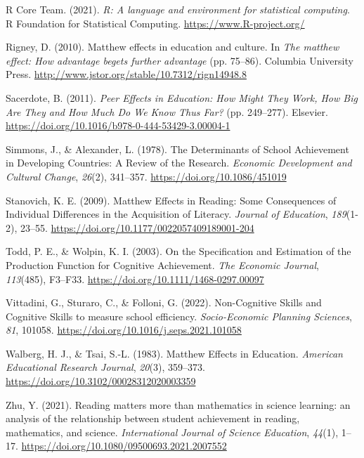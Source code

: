 \documentclass[
]{article}
\newlength{\cslhangindent}
\newenvironment{CSLReferences}[2] %
 {\begin{list}{}{%
  \setlength{\itemindent}{0pt}
  \setlength{\leftmargin}{0pt}
  \setlength{\parsep}{0pt}
  \ifodd #1
   \setlength{\leftmargin}{\cslhangindent}
   \setlength{\itemindent}{-1\cslhangindent}
  \fi
  \setlength{\itemsep}{#2\baselineskip}}}
 {\end{list}}
\begin{document}
\begin{CSLReferences}{1}{0}
R Core Team. (2021). \emph{R: A language and environment for statistical
computing}. R Foundation for Statistical Computing.
\url{https://www.R-project.org/}

Rigney, D. (2010). Matthew effects in education and culture. In
\emph{The matthew effect: How advantage begets further advantage} (pp.
75--86). Columbia University Press.
\url{http://www.jstor.org/stable/10.7312/rign14948.8}

Sacerdote, B. (2011). \emph{Peer Effects in Education: How Might They
Work, How Big Are They and How Much Do We Know Thus Far?} (pp.
249--277). Elsevier.
\url{https://doi.org/10.1016/b978-0-444-53429-3.00004-1}

Simmons, J., \& Alexander, L. (1978). The Determinants of School
Achievement in Developing Countries: A Review of the Research.
\emph{Economic Development and Cultural Change}, \emph{26}(2), 341--357.
\url{https://doi.org/10.1086/451019}

Stanovich, K. E. (2009). Matthew Effects in Reading: Some Consequences
of Individual Differences in the Acquisition of Literacy. \emph{Journal
of Education}, \emph{189}(1-2), 23--55.
\url{https://doi.org/10.1177/0022057409189001-204}

Todd, P. E., \& Wolpin, K. I. (2003). On the Specification and
Estimation of the Production Function for Cognitive Achievement.
\emph{The Economic Journal}, \emph{113}(485), F3--F33.
\url{https://doi.org/10.1111/1468-0297.00097}

Vittadini, G., Sturaro, C., \& Folloni, G. (2022). Non-Cognitive Skills
and Cognitive Skills to measure school efficiency. \emph{Socio-Economic
Planning Sciences}, \emph{81}, 101058.
\url{https://doi.org/10.1016/j.seps.2021.101058}

Walberg, H. J., \& Tsai, S.-L. (1983). Matthew Effects in Education.
\emph{American Educational Research Journal}, \emph{20}(3), 359--373.
\url{https://doi.org/10.3102/00028312020003359}

Zhu, Y. (2021). Reading matters more than mathematics in science
learning: an analysis of the relationship between student achievement in
reading, mathematics, and science. \emph{International Journal of
Science Education}, \emph{44}(1), 1--17.
\url{https://doi.org/10.1080/09500693.2021.2007552}

\end{CSLReferences}
\end{document}
